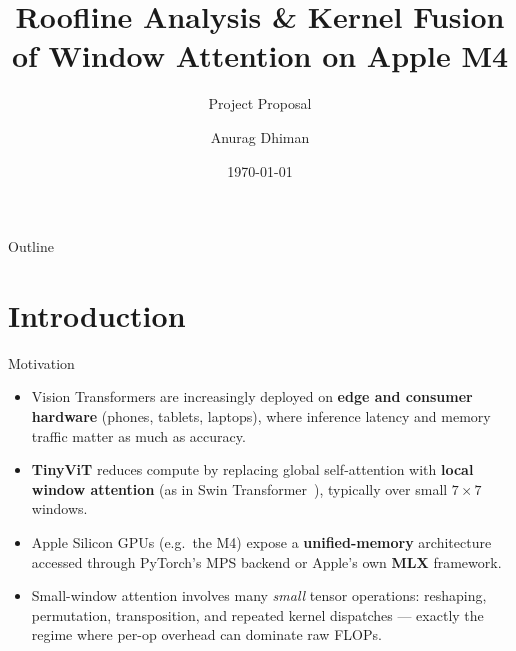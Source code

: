 \documentclass[aspectratio=169]{beamer}
\title[Roofline \& Kernel Fusion of Window Attention]{%
  Roofline Analysis \& Kernel Fusion of Window Attention on Apple M4}
\subtitle{Project Proposal}
\author{Anurag Dhiman}
\institute{}
\date{\today}
\begin{document}
\begin{frame}
  \titlepage
\end{frame}

\begin{frame}{Outline}
  \tableofcontents
\end{frame}

\section{Introduction}

\begin{frame}{Motivation}
  \begin{itemize}
    \item Vision Transformers are increasingly deployed on \textbf{edge and consumer hardware}
      (phones, tablets, laptops), where inference latency and memory traffic matter as much
      as accuracy.
    \item \textbf{TinyViT} \cite{wu2022tinyvit} reduces compute by replacing global self-attention
      with \textbf{local window attention} (as in Swin Transformer~\cite{liu2021swin}), typically
      over small $7\times7$ windows.
    \item Apple Silicon GPUs (e.g.\ the M4) expose a \textbf{unified-memory} architecture accessed
      through PyTorch's MPS backend or Apple's own \textbf{MLX} framework.
    \item Small-window attention involves many \emph{small} tensor operations: reshaping,
      permutation, transposition, and repeated kernel dispatches --- exactly the regime where
      per-op overhead can dominate raw FLOPs.
  \end{itemize}
\end{frame}
\end{document}
